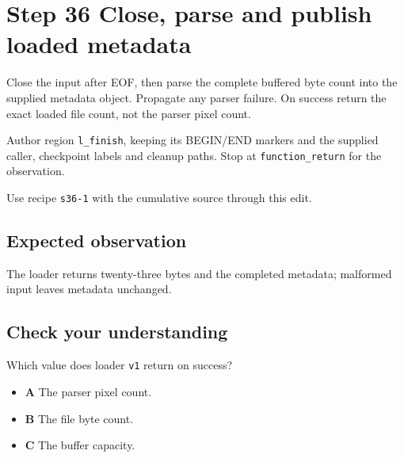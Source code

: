 \section{Step 36 Close, parse and publish loaded metadata}\label{ppm-s36}

Close the input after EOF, then parse the complete buffered byte count into the supplied metadata object. Propagate any parser failure. On success return the exact loaded file count, not the parser pixel count.

Author region \texttt{l\_finish}, keeping its BEGIN/END markers and the supplied caller, checkpoint labels and cleanup paths. Stop at \texttt{function\_return} for the observation.

Use recipe \texttt{s36-1} with the cumulative source through this edit.

\subsection{Expected observation}
The loader returns twenty-three bytes and the completed metadata; malformed input leaves metadata unchanged.

\subsection{Check your understanding}
Which value does loader \texttt{v1} return on success?

\begin{itemize}
\item \textbf{A} The parser pixel count.
\item \textbf{B} The file byte count.
\item \textbf{C} The buffer capacity.
\end{itemize}
